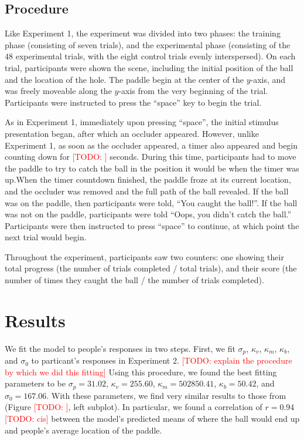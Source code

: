 \documentclass[10pt,letterpaper]{article}
\newcommand{\TODO}[1]{\textcolor{red}{[TODO: #1]}}
\begin{document}
\subsection{Procedure}

Like Experiment 1, the experiment was divided into two phases: the training phase (consisting of seven trials), and the experimental phase (consisting of the 48 experimental trials, with the eight control trials evenly interspersed). On each trial, participants were shown the scene, including the initial position of the ball and the location of the hole. The paddle begin at the center of the $y$-axis, and was freely moveable along the $y$-axis from the very beginning of the trial. Participants were instructed to press the ``space'' key to begin the trial. 

As in Experiment 1, immediately upon pressing ``space'', the initial stimulus presentation began, after which an occluder appeared. However, unlike Experiment 1, as soon as the occluder appeared, a timer also appeared and begin counting down for \TODO{} seconds. During this time, participants had to move the paddle to try to catch the ball in the position it would be when the timer was up.When the timer countdown finished, the paddle froze at its current location, and the occluder was removed and the full path of the ball revealed. If the ball was on the paddle, then participants were told, ``You caught the ball!''. If the ball was not on the paddle, participants were told ``Oops, you didn't catch the ball.'' Participants were then instructed to press ``space'' to continue, at which point the next trial would begin.

Throughout the experiment, participants saw two counters: one showing their total progress (the number of trials completed / total trials), and their score (the number of times they caught the ball / the number of trials completed).

\section{Results}

We fit the model to people's responses in two steps. First, we fit $\sigma_p$, $\kappa_v$, $\kappa_m$, $\kappa_b$, and $\sigma_0$ to particant's responses in Experiment 2. \TODO{explain the procedure by which we did this fitting} Using this procedure, we found the best fitting parameters to be $\sigma_p=31.02$, $\kappa_v=255.60$, $\kappa_m=502850.41$, $\kappa_b=50.42$, and $\sigma_0=167.06$. With these parameters, we find very similar results to those from  (Figure \TODO{}, left subplot). In particular, we found a correlation of $r=0.94$ \TODO{cis} between the model's predicted means of where the ball would end up and people's average location of the paddle.
\end{document}
